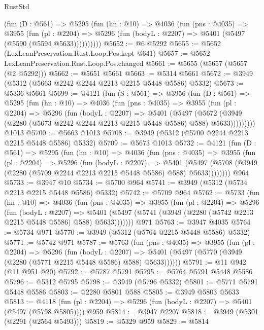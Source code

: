 \begin{lexlean}{RustStd}
\begin{coremodule}
        (fun (D : @561) =>
        @5295
          (fun (hn : @10) =>
          @4036
            (fun (pns : @4035) =>
            @3955
              (fun (pl : @2204) =>
              @5296 (fun (bodyL : @2207) => @5401 (@5497 (@5590 (@5594 @5633))))))))))
@5652 := @6 @5292
@5655 := @5652 (LexLeanPreservation.Rust.Loop.Pos.kept @641)
@5657 := @5652 LexLeanPreservation.Rust.Loop.Pos.changed
@5661 := @5655 (@5657 (@5657 (@2 @5292)))
@5662 := @5651 @5661
@5663 := @5314 @5661
@5672 := @3949 (@5312 (@5663 @2242 @2244 @2213 @2215 @5448 @5586) @5332)
@5673 := @5336 @5661
@5699 := @4121
    (fun (S : @561) =>
    @3956
      (fun (D : @561) =>
      @5295
        (fun (hn : @10) =>
        @4036
          (fun (pns : @4035) =>
          @3955
            (fun (pl : @2204) =>
            @5296
              (fun (bodyL : @2207) =>
              @5401
                (@5497
                  (@5672
                    (@3949 (@2280 (@5673 @2242 @2244 @2213 @2215 @5448 @5586) @588) @5633)))))))))
    @1013
@5700 := @5663 @1013
@5708 := @3949 (@5312 (@5700 @2244 @2213 @2215 @5448 @5586) @5332)
@5709 := @5673 @1013
@5732 := @4121
    (fun (D : @561) =>
    @5295
      (fun (hn : @10) =>
      @4036
        (fun (pns : @4035) =>
        @3955
          (fun (pl : @2204) =>
          @5296
            (fun (bodyL : @2207) =>
            @5401
              (@5497 (@5708 (@3949 (@2280 (@5709 @2244 @2213 @2215 @5448 @5586) @588) @5633))))))))
    @964
@5733 := @3947 @10
@5734 := @5700 @964
@5741 := @3949 (@5312 (@5734 @2213 @2215 @5448 @5586) @5332)
@5742 := @5709 @964
@5762 := @5733
    (fun (hn : @10) =>
    @4036
      (fun (pns : @4035) =>
      @3955
        (fun (pl : @2204) =>
        @5296
          (fun (bodyL : @2207) =>
          @5401 (@5497 (@5741 (@3949 (@2280 (@5742 @2213 @2215 @5448 @5586) @588) @5633)))))))
    @971
@5763 := @3947 @4035
@5764 := @5734 @971
@5770 := @3949 (@5312 (@5764 @2215 @5448 @5586) @5332)
@5771 := @5742 @971
@5787 := @5763
    (fun (pns : @4035) =>
    @3955
      (fun (pl : @2204) =>
      @5296
        (fun (bodyL : @2207) =>
        @5401 (@5497 (@5770 (@3949 (@2280 (@5771 @2215 @5448 @5586) @588) @5633))))))
@5791 := @11 @942 (@11 @951 @20)
@5792 := @5787 @5791
@5795 := @5764 @5791 @5448 @5586
@5796 := @5312 @5795
@5798 := @3949 (@5796 @5332)
@5801 := @5771 @5791 @5448 @5586
@5803 := @2280 @5801 @588
@5805 := @3949 @5803 @5633
@5813 := @4118 (fun (pl : @2204) => @5296 (fun (bodyL : @2207) => @5401 (@5497 (@5798 @5805)))) @959
@5814 := @3947 @2207
@5818 := @3949 (@5301 (@2291 (@2564 @5493)))
@5819 := @5329 @959
@5829 := @5814

\end{coremodule}
\end{lexlean}
